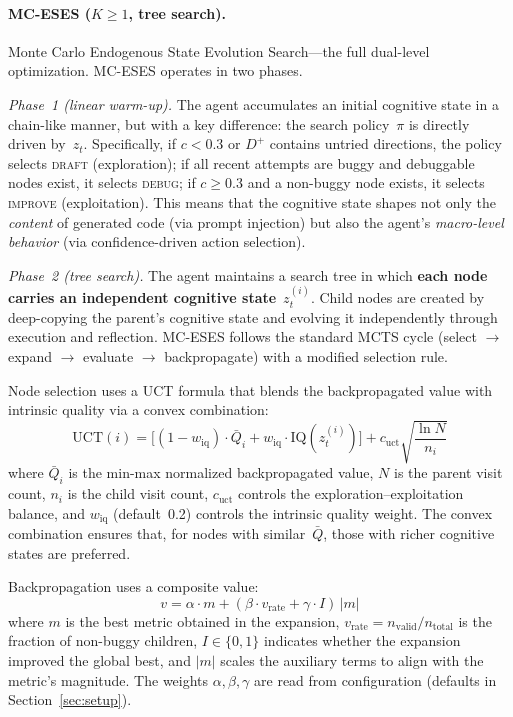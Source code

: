 \documentclass{article} %
\newcommand{\zt}{z_t}
\begin{document}
\paragraph{MC-ESES ($K{\geq}1$, tree search).}
Monte Carlo Endogenous State Evolution Search---the full dual-level
optimization. MC-ESES operates in two phases.

\emph{Phase~1 (linear warm-up).} The agent accumulates an initial cognitive
state in a chain-like manner, but with a key difference: the search
policy~$\pi$ is directly driven by~$\zt$.
Specifically, if $c < 0.3$ or $D^{+}$ contains untried directions, the policy
selects \textsc{draft} (exploration); if all recent attempts are buggy and
debuggable nodes exist, it selects \textsc{debug}; if $c \geq 0.3$ and a
non-buggy node exists, it selects \textsc{improve} (exploitation).
This means that the cognitive state shapes not only the \emph{content} of
generated code (via prompt injection) but also the agent's \emph{macro-level
behavior} (via confidence-driven action selection).

\emph{Phase~2 (tree search).} The agent maintains a search tree in which
\textbf{each node carries an independent cognitive state}~$\zt^{(i)}$. Child
nodes are created by deep-copying the parent's cognitive state and evolving it
independently through execution and reflection. MC-ESES follows the standard
MCTS cycle (select $\to$ expand $\to$ evaluate $\to$ backpropagate) with a
modified selection rule.

Node selection uses a UCT formula that blends the backpropagated value with
intrinsic quality via a convex combination:
\begin{equation}
  \text{UCT}(i) = \big[(1 - w_{\text{iq}}) \cdot \bar{Q}_i
  + w_{\text{iq}} \cdot \text{IQ}(\zt^{(i)})\big]
  + c_{\text{uct}} \sqrt{\frac{\ln N}{n_i}}
  \label{eq:uct}
\end{equation}
where $\bar{Q}_i$ is the min-max normalized backpropagated value,
$N$ is the parent visit count, $n_i$ is the child visit count,
$c_{\text{uct}}$ controls the exploration--exploitation balance, and
$w_{\text{iq}}$ (default~0.2) controls the intrinsic quality weight.
The convex combination ensures that, for nodes with similar~$\bar{Q}$,
those with richer cognitive states are preferred.

Backpropagation uses a composite value:
\begin{equation}
  v = \alpha \cdot m
  + (\beta \cdot v_{\text{rate}} + \gamma \cdot I)\, |m|
  \label{eq:backprop}
\end{equation}
where $m$ is the best metric obtained in the expansion,
$v_{\text{rate}} = n_{\text{valid}} / n_{\text{total}}$ is the fraction of
non-buggy children,
$I \in \{0, 1\}$ indicates whether the expansion improved the global best,
and $|m|$ scales the auxiliary terms to align with the metric's magnitude.
The weights $\alpha, \beta, \gamma$ are read from configuration (defaults in
Section~\ref{sec:setup}).
\end{document}
